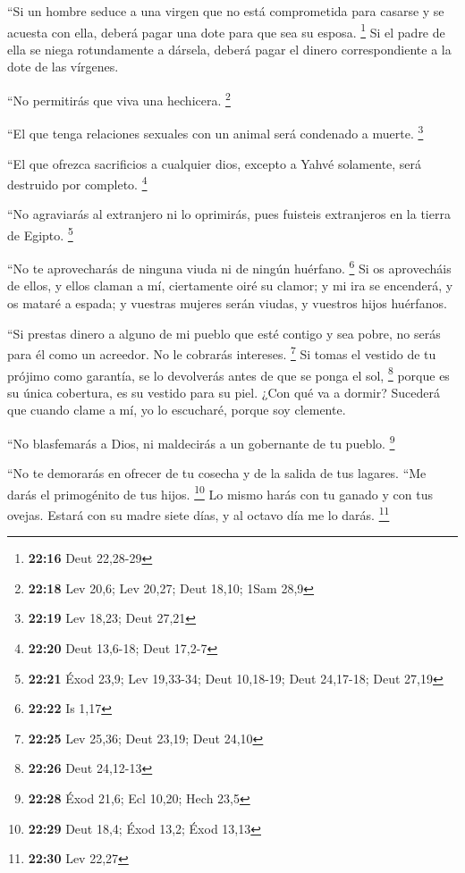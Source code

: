 \begin{paracol}{2}
 ``Si un hombre seduce a una virgen que no está
comprometida para casarse y se acuesta con ella, deberá pagar una dote
para que sea su esposa. \footnote{\textbf{22:16} Deut 22,28-29}
 Si el padre de ella se niega rotundamente a dársela,
deberá pagar el dinero correspondiente a la dote de las vírgenes.

 ``No permitirás que viva una hechicera. \footnote{\textbf{22:18}
  Lev 20,6; Lev 20,27; Deut 18,10; 1Sam 28,9}

 ``El que tenga relaciones sexuales con un animal será
condenado a muerte. \footnote{\textbf{22:19} Lev 18,23; Deut 27,21}

 ``El que ofrezca sacrificios a cualquier dios, excepto a
Yahvé solamente, será destruido por completo. \footnote{\textbf{22:20}
  Deut 13,6-18; Deut 17,2-7}

 ``No agraviarás al extranjero ni lo oprimirás, pues
fuisteis extranjeros en la tierra de Egipto. \footnote{\textbf{22:21}
  Éxod 23,9; Lev 19,33-34; Deut 10,18-19; Deut 24,17-18; Deut 27,19}

 ``No te aprovecharás de ninguna viuda ni de ningún
huérfano. \footnote{\textbf{22:22} Is 1,17}  Si os
aprovecháis de ellos, y ellos claman a mí, ciertamente oiré su clamor;
 y mi ira se encenderá, y os mataré a espada; y vuestras
mujeres serán viudas, y vuestros hijos huérfanos.

 ``Si prestas dinero a alguno de mi pueblo que esté
contigo y sea pobre, no serás para él como un acreedor. No le cobrarás
intereses. \footnote{\textbf{22:25} Lev 25,36; Deut 23,19; Deut 24,10}
 Si tomas el vestido de tu prójimo como garantía, se lo
devolverás antes de que se ponga el sol, \footnote{\textbf{22:26} Deut
  24,12-13}  porque es su única cobertura, es su vestido
para su piel. ¿Con qué va a dormir? Sucederá que cuando clame a mí, yo
lo escucharé, porque soy clemente.

 ``No blasfemarás a Dios, ni maldecirás a un gobernante
de tu pueblo. \footnote{\textbf{22:28} Éxod 21,6; Ecl 10,20; Hech 23,5}

 ``No te demorarás en ofrecer de tu cosecha y de la
salida de tus lagares. ``Me darás el primogénito de tus hijos.
\footnote{\textbf{22:29} Deut 18,4; Éxod 13,2; Éxod 13,13}
 Lo mismo harás con tu ganado y con tus ovejas. Estará
con su madre siete días, y al octavo día me lo darás. \footnote{\textbf{22:30}
  Lev 22,27}


\end{paracol}
